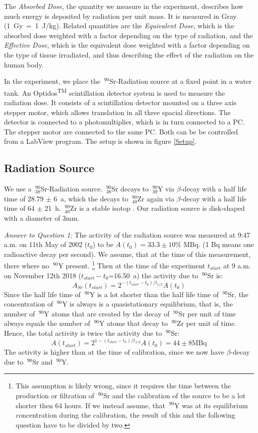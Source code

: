 \documentclass[a4paper,parskip]{scrartcl}
\begin{document}
The \textit{Absorbed Dose}, the quantity we measure in the experiment, describes how much energy is deposited by radiation per unit mass. It is measured in Gray (1~Gy~=~1~J/kg). Related quantities are the \textit{Equivalent Dose}, which is the absorbed dose weighted with a factor depending on the type of radiation, and the \textit{Effective Dose}, which is the equivalent dose weighted with a factor depending on the type of tissue irradiated, and thus describing the effect of the radiation on the human body.

In the experiment, we place the $~^{90}$Sr-Radiation source at a fixed point in a water tank. An Optidos\textsuperscript{TM} scintillation detector system is used to measure the radiation dose. It consists of a scintillation detector mounted on a three axis stepper motor, which allows translation in all three spacial directions. The detector is connected to a photomultiplier, which is in turn connected to a PC. The stepper motor are connected to the same PC. Both can be be controlled from a LabView program. The setup is shown in figure \ref{Setup}.

\subsection{Radiation Source}

We use a $~^{90}_{38}$Sr-Radiation source. $~^{90}_{38}$Sr decays to $~^{90}_{39}$Y via $\beta$-decay with a half life time of 28.79 $\pm$ 6~a, which the decays to $~^{90}_{40}$Zr again via $\beta$-decay with a half life time of 64 $\pm$ 21~h.  $~^{90}_{40}$Zr is a stable isotop \cite{Ref:2}. Our radiation source is disk-shaped with a diameter of 3mm.

\textit{Answer to Question 1:} The activity of the radiation source was measured at 9:47 a.m.
on 11th May of 2002 ($t_0$) to be $A(t_0) = 33.3 \pm 10\% \textrm{ MBq}$. (1 Bq means one radioactive decay per second). We assume, that at the time of this measurement, there where no $~^{90}$Y present. \footnote{This assumption is likely wrong, since it requires the time between the production or filtration of $~^{90}$Sr and the calibration of the source to be a lot shorter then 64 hours. If we instead assume, that $~^{90}$Y was at its equilibrium concentration during the calibration, the result of this and the following question have to be divided by two.} Then at the time of the experiment $t_{start}$ at 9 a.m. on November 12th 2018 ($t_{start}-t_0$=16.50~a) the activity due to $~^{90}$Sr  is:
$$A_{Sr}(t_{start}) = 2^{-(t_{start}-t_0)/t_{1/2}}A(t_0)$$
Since the half life time of $~^{90}$Y is a lot shorter than the half life time of $~^{90}$Sr, the concentration of $~^{90}$Y is always is a quasistationary equilibrium, that is, the number of $~^{90}$Y atoms that are created by the decay of $~^{90}$Sr per unit of time always equals the number of $~^{90}$Y atoms that decay to $~^{90}$Zr per unit of time. Hence, the total activity is twice the activity due to $~^{90}$Sr:
$$A(t_{start})= 2^{1-(t_{start}-t_0)/t_{1/2}}A(t_0) = 44 \pm 8 \textrm{MBq}$$
The activity is higher than at the time of calibration, since we now have $\beta$-decay due to $~^{90}$Sr and $~^{90}$Y.  
\end{document}
